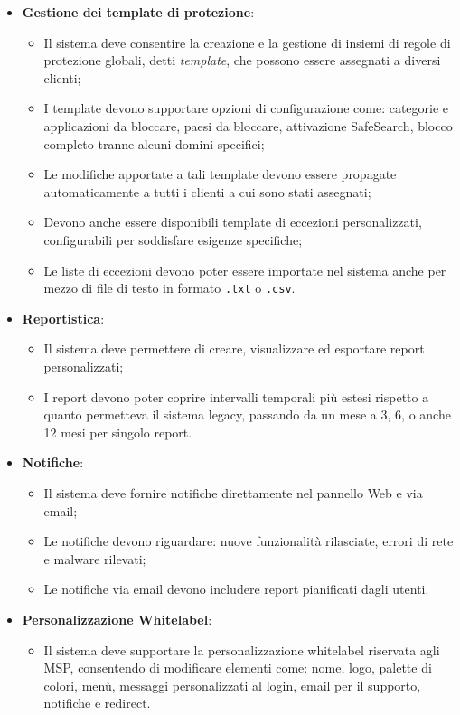 \begin{itemize}
  \item \textbf{Gestione dei template di protezione}:
    \begin{itemize}
      \item Il sistema deve consentire la creazione e la gestione di insiemi di regole di protezione globali, detti \emph{template}, che possono essere assegnati a diversi clienti;
      \item I template devono supportare opzioni di configurazione come: categorie e applicazioni da bloccare, paesi da bloccare, attivazione SafeSearch, blocco completo tranne alcuni domini specifici;
      \item Le modifiche apportate a tali template devono essere propagate automaticamente a tutti i clienti a cui sono stati assegnati;
      \item Devono anche essere disponibili template di eccezioni personalizzati, configurabili per soddisfare esigenze specifiche;
      \item Le liste di eccezioni devono poter essere importate nel sistema anche per mezzo di file di testo in formato \texttt{.txt} o \texttt{.csv}.
    \end{itemize}

  \item \textbf{Reportistica}:
    \begin{itemize}
      \item Il sistema deve permettere di creare, visualizzare ed esportare report personalizzati;
      \item I report devono poter coprire intervalli temporali più estesi rispetto a quanto permetteva il sistema legacy, passando da un mese a 3, 6, o anche 12 mesi per singolo report.
    \end{itemize}

  \item \textbf{Notifiche}:
    \begin{itemize}
      \item Il sistema deve fornire notifiche direttamente nel pannello Web e via email;
      \item Le notifiche devono riguardare: nuove funzionalità rilasciate, errori di rete e malware rilevati;
      \item Le notifiche via email devono includere report pianificati dagli utenti.
    \end{itemize}

  \item \textbf{Personalizzazione Whitelabel}:
    \begin{itemize}
      \item Il sistema deve supportare la personalizzazione whitelabel riservata agli MSP, consentendo di modificare elementi come: nome, logo, palette di colori, menù, messaggi personalizzati al login, email per il supporto, notifiche e redirect.
    \end{itemize}


\end{itemize}
